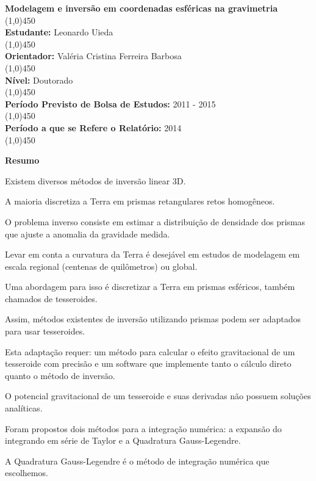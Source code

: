 \documentclass[12pt]{letter}
\begin{document}
\thispagestyle{fancy}

\begin{flushleft}

\textbf{Modelagem e inversão em coordenadas esféricas na gravimetria}\\
\line(1,0){450}
\\\textbf{Estudante:} Leonardo Uieda\\
\line(1,0){450}
\\\textbf{Orientador:} Valéria Cristina Ferreira Barbosa\\
\line(1,0){450}
\\\textbf{Nível:} Doutorado\\
\line(1,0){450}
\\\textbf{Período Previsto de Bolsa de Estudos:} 2011 - 2015\\
\line(1,0){450}
\\\textbf{Período a que se Refere o Relatório:} 2014\\
\line(1,0){450}

\textbf{Resumo}
\\
\vspace{10 mm}

Existem diversos métodos de inversão linear 3D.

A maioria discretiza a Terra em prismas retangulares retos homogêneos.

O problema inverso consiste em estimar a distribuição de densidade dos prismas
que ajuste a anomalia da gravidade medida.

Levar em conta a curvatura da Terra é desejável em estudos de modelagem em
escala regional (centenas de quilômetros) ou global.

Uma abordagem para isso é discretizar a Terra em prismas esféricos, também
chamados de tesseroides.

Assim, métodos existentes de inversão utilizando prismas podem ser adaptados
para usar tesseroides.

Esta adaptação requer:
um método para calcular o efeito gravitacional de um tesseroide com precisão
e um software que implemente tanto o cálculo direto quanto o método de inversão.


O potencial gravitacional de um tesseroide e suas derivadas não possuem
soluções analíticas.

Foram propostos dois métodos para a integração numérica: a expansão do
integrando em série de Taylor e a Quadratura Gauss-Legendre.

A Quadratura Gauss-Legendre é o método de integração numérica que escolhemos.


\end{flushleft}
\end{document}
